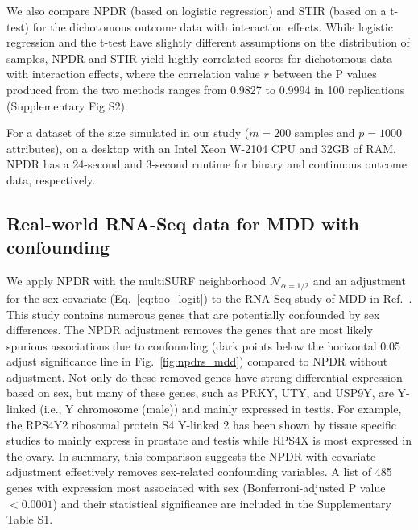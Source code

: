 \documentclass[10pt]{article}
\begin{document}
We also compare NPDR (based on logistic regression) and STIR (based on a t-test) for the dichotomous outcome data with interaction effects.
While logistic regression and the t-test have slightly different assumptions on the distribution of samples, NPDR and STIR yield highly correlated scores for dichotomous data with interaction effects, where the correlation value $r$ between the P values produced from the two methods ranges from 0.9827 to 0.9994 in 100 replications (Supplementary Fig S2). 

For a dataset of the size simulated in our study ($m=200$ samples and $p=1000$ attributes), on a desktop with an Intel Xeon W-2104 CPU and 32GB of RAM, NPDR has a 24-second and 3-second runtime for binary and continuous outcome data, respectively.

\subsection{Real-world RNA-Seq data for MDD with confounding}
We apply NPDR with the multiSURF neighborhood $\mathcal{N}_{\alpha=1/2}$ and an adjustment for the sex covariate (Eq.~\ref{eq:too_logit}) to the RNA-Seq study of MDD in Ref.~\cite{mostafavi14}.
This study contains numerous genes that are potentially confounded by sex differences. 
The NPDR adjustment removes the genes that are most likely spurious associations due to confounding (dark points below the horizontal 0.05 adjust significance line in Fig.~\ref{fig:npdrs_mdd}) compared to NPDR without adjustment. 
Not only do these removed genes have strong differential expression based on sex, but many of these genes, such as PRKY, UTY, and USP9Y, are Y-linked (i.e., Y chromosome (male)) and mainly expressed in testis. For example, the RPS4Y2 ribosomal protein S4 Y-linked 2 has been shown by tissue specific studies to mainly express in prostate and testis \cite{lopes2010human} while RPS4X is most expressed in the ovary. 
In summary, this comparison suggests the NPDR with covariate adjustment effectively removes sex-related confounding variables.
A list of 485 genes with expression most associated with sex (Bonferroni-adjusted P value $<0.0001$) and their statistical significance are included in the Supplementary Table S1.
\end{document}
